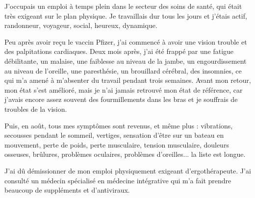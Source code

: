 J'occupais un emploi à temps plein dans le secteur des soins de santé, qui était
très exigeant sur le plan physique. Je travaillais dur tous les jours et j'étais
actif, randonneur, voyageur, social, heureux, dynamique.

Peu après avoir reçu le vaccin Pfizer, j'ai commencé à avoir une vision trouble
et des palpitations cardiaques. Deux mois après, j'ai été frappé par une fatigue
débilitante, un malaise, une faiblesse au niveau de la jambe, un engourdissement
au niveau de l'oreille, une paresthésie, un brouillard cérébral, des insomnies,
ce qui m'a amené à m'absenter du travail pendant trois semaines. Avant mon
retour, mon état s'est amélioré, mais je n'ai jamais retrouvé mon état de
référence, car j'avais encore assez souvent des fourmillements dans les bras et
je souffrais de troubles de la vision.

Puis, en août, tous mes symptômes sont revenus, et même plus : vibrations,
secousses pendant le sommeil, vertiges, sensation d'être sur un bateau en
mouvement, perte de poids, perte musculaire, tension musculaire, douleurs
osseuses, brûlures, problèmes oculaires, problèmes d'oreilles... la liste est
longue.

J'ai dû démissionner de mon emploi physiquement exigeant d'ergothérapeute. J'ai
consulté un médecin spécialisé en médecine intégrative qui m'a fait prendre
beaucoup de suppléments et d'antiviraux.
